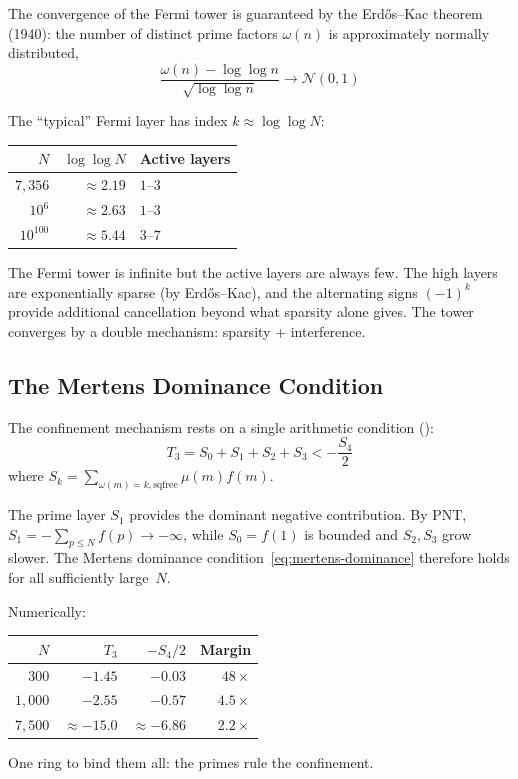 The convergence of the Fermi tower is guaranteed by the
Erd\H{o}s--Kac theorem (1940): the number of distinct prime
factors $\omega(n)$ is approximately normally distributed,
\[
  \frac{\omega(n) - \log\log n}{\sqrt{\log\log n}} \to \mathcal{N}(0,1)
\]

\begin{principle}
The ``typical'' Fermi layer has index $k \approx \log\log N$:
\begin{center}
\small
\begin{tabular}{@{}rrl@{}}
\toprule
$N$ & $\log\log N$ & \textbf{Active layers} \\
\midrule
$7{,}356$ & $\approx 2.19$ & $1$--$3$ \\
$10^6$ & $\approx 2.63$ & $1$--$3$ \\
$10^{100}$ & $\approx 5.44$ & $3$--$7$ \\
\bottomrule
\end{tabular}
\end{center}
The Fermi tower is infinite but the active layers are always few.
The high layers are exponentially sparse (by Erd\H{o}s--Kac), and
the alternating signs $(-1)^k$ provide additional cancellation
beyond what sparsity alone gives. The tower converges by a
double mechanism: sparsity + interference.
\end{principle}

\subsection{The Mertens Dominance Condition}

The confinement mechanism rests on a single arithmetic condition
():
\begin{equation}
  T_3 = S_0 + S_1 + S_2 + S_3 < -\frac{S_4}{2}
  \label{eq:mertens-dominance}
\end{equation}
where $S_k = \sum_{\omega(m)=k, \text{sqfree}} \mu(m) f(m)$.

\begin{principle}
The prime layer $S_1$ provides the dominant negative contribution.
By PNT, $S_1 = -\sum_{p \leq N} f(p) \to -\infty$, while $S_0 = f(1)$
is bounded and $S_2, S_3$ grow slower. The Mertens dominance
condition~\eqref{eq:mertens-dominance} therefore holds for all
sufficiently large~$N$.

Numerically:
\begin{center}
\small
\begin{tabular}{@{}rrrr@{}}
\toprule
$N$ & $T_3$ & $-S_4/2$ & Margin \\
\midrule
300 & $-1.45$ & $-0.03$ & $48\times$ \\
$1{,}000$ & $-2.55$ & $-0.57$ & $4.5\times$ \\
$7{,}500$ & $\approx -15.0$ & $\approx -6.86$ & $2.2\times$ \\
\bottomrule
\end{tabular}
\end{center}

One ring to bind them all: the primes rule the confinement.
\end{principle}


